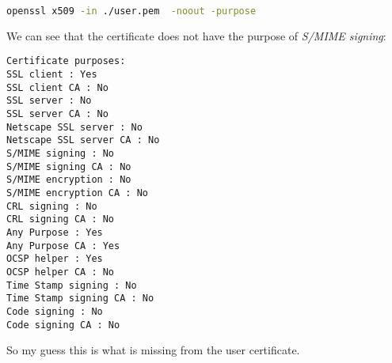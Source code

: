 \documentclass{article}
\begin{document}
\begin{lstlisting}[language=bash]
openssl x509 -in ./user.pem  -noout -purpose
\end{lstlisting}

We can see that the certificate does not have the purpose of \emph{S/MIME signing}:

\begin{verbatim}
Certificate purposes:
SSL client : Yes
SSL client CA : No
SSL server : No
SSL server CA : No
Netscape SSL server : No
Netscape SSL server CA : No
S/MIME signing : No
S/MIME signing CA : No
S/MIME encryption : No
S/MIME encryption CA : No
CRL signing : No
CRL signing CA : No
Any Purpose : Yes
Any Purpose CA : Yes
OCSP helper : Yes
OCSP helper CA : No
Time Stamp signing : No
Time Stamp signing CA : No
Code signing : No
Code signing CA : No
\end{verbatim}

So my guess this is what is missing from the user certificate.
\end{document}
